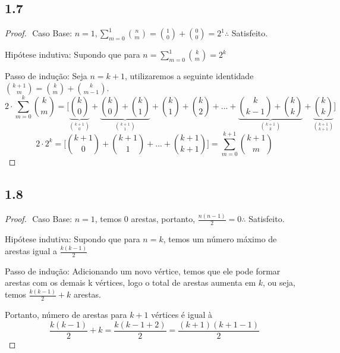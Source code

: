 \documentclass{article}
\begin{document}
\subsection*{1.7}
\begin{proof}
$ $\newline
Caso Base: $n = 1,\sum^1_{m=0}{n\choose m}={1\choose 0}+{0\choose 0}=2^1 \therefore$ Satisfeito.

Hipótese indutiva: Supondo que para $n=\sum^1_{m=0}{k\choose m}=2^k$

Passo de indução: Seja $n = k + 1$, utilizaremos a seguinte identidade ${k+1\choose m} = {k\choose m}+{k \choose m-1}$.
$$2\cdot \sum^k_{m=0}{k\choose m} = \bigg[\underbrace{{k\choose 0}}_{k+1\choose0}  + \underbrace{{k\choose 0}+{k\choose 1}}_{k+1\choose 1}
+{k\choose 1}+{k \choose 2}+...+
\underbrace{{k\choose k-1}+{k\choose k}}_{k+1\choose k}+\underbrace{{k\choose k}}_{k+1\choose k+1}\bigg]$$
$$2\cdot 2^k = \bigg[{k+1\choose0}+{k+1\choose1}+...+{k+1\choose k+1}\bigg] = \sum^{k+1}_{m=0}{k+1\choose m}$$

\end{proof}

\subsection*{1.8}
\begin{proof}
$ $\newline
Caso Base: $n = 1$, temos 0 arestas, portanto, $\frac{n(n-1)}{2} = 0 \therefore$ Satisfeito.

Hipótese indutiva: Supondo que para $n=k$, temos um número máximo de arestas igual a $\frac{k(k-1)}{2}$

Passo de indução: Adicionando um novo vértice, temos que ele pode formar arestas com os demais k
vértices, logo o total de arestas aumenta em $k$, ou seja, temos $\frac{k(k-1)}{2}+k$ arestas.

Portanto, número de arestas para $k+1$ vértices é igual à 
$$\frac{k(k-1)}{2}+k = \frac{k(k-1 + 2)}{2} = \frac{(k+1)(k+1 -1)}{2}$$

\end{proof}
\end{document}
